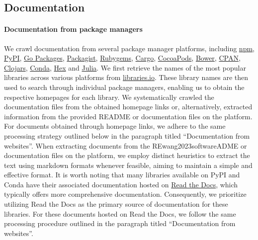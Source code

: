 \documentclass[10pt]{article} %
\begin{document}
\subsection{Documentation}\label{sec:source_documentation}

\paragraph{Documentation from package managers} We crawl documentation from several package manager platforms, including \href{https://www.npmjs.com}{npm}, \href{https://pypi.org/}{PyPI}, \href{https://pkg.go.dev}{Go Packages}, \href{https://packagist.org}{Packagist}, \href{https://rubygems.org}{Rubygems}, \href{https://crates.io}{Cargo}, \href{http://cocoapods.org/}{CocoaPods}, \href{http://bower.io}{Bower}, \href{https://metacpan.org}{CPAN}, 
\href{https://clojars.org}{Clojars}, 
\href{https://anaconda.org}{Conda},
\href{https://hex.pm}{Hex} and \href{http://pkg.julialang.org}{Julia}. We first retrieve the names of the most popular libraries across various platforms from \href{https://libraries.io}{libraries.io}. These library names are then used to search through individual package managers, enabling us to obtain the respective homepages for each library. We systematically crawled the documentation files from the obtained homepage links or, alternatively, extracted information from the provided README or documentation files on the platform. 
For documents obtained through homepage links, we adhere to the same processing strategy outlined below in the paragraph titled ``Documentation from websites''.
When extracting documents from the REwang2023softwareADME or documentation files on the platform, we employ distinct heuristics to extract the text using markdown formats whenever feasible, aiming to maintain a simple and effective format.
It is worth noting that many libraries available on PyPI and Conda have their associated documentation hosted on \href{https://readthedocs.org/}{Read the Docs}, which typically offers more comprehensive documentation. Consequently, we prioritize utilizing Read the Docs as the primary source of documentation for these libraries.
For these documents hosted on Read the Docs, we follow the same processing procedure outlined in the paragraph titled ``Documentation from websites''.
\end{document}

